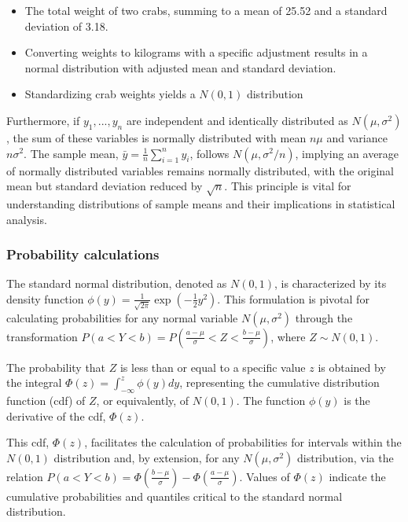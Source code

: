 \documentclass{article}
\begin{document}
\begin{itemize}
    \item The total weight of two crabs, summing to a mean of 25.52 and a standard deviation of 3.18.
    \item Converting weights to kilograms with a specific adjustment results in a normal distribution with adjusted mean and standard deviation.
    \item Standardizing crab weights yields a $N(0,1)$ distribution
\end{itemize}

Furthermore, if $y_1,...,y_n$ are independent and identically distributed as $N(\mu, \sigma^2)$, the sum of these variables is normally distributed with mean $n \mu$ and variance $n \sigma ^2$. The sample mean, $\bar{y} = \frac {1} {n} \sum_{i=1}^{n} y_i$, follows $N(\mu, \sigma ^2 / n)$, implying an average of normally distributed variables remains normally distributed, with the original mean but standard deviation reduced by $\sqrt{n}$. This principle is vital for understanding distributions of sample means and their implications in statistical analysis.

\subsubsection{Probability calculations}
The standard normal distribution, denoted as \(N(0, 1)\), is characterized by its density function \(\phi(y) = \frac{1}{\sqrt{2\pi}} \exp\left(-\frac{1}{2}y^2\right)\). This formulation is pivotal for calculating probabilities for any normal variable \(N(\mu, \sigma^2)\) through the transformation \(P(a < Y < b) = P\left(\frac{a - \mu}{\sigma} < Z < \frac{b - \mu}{\sigma}\right)\), where \(Z \sim N(0, 1)\).

The probability that \(Z\) is less than or equal to a specific value \(z\) is obtained by the integral \(\Phi(z) = \int_{-\infty}^{z} \phi(y) dy\), representing the cumulative distribution function (cdf) of \(Z\), or equivalently, of \(N(0, 1)\). The function \(\phi(y)\) is the derivative of the cdf, \(\Phi(z)\).

This cdf, \(\Phi(z)\), facilitates the calculation of probabilities for intervals within the \(N(0, 1)\) distribution and, by extension, for any \(N(\mu, \sigma^2)\) distribution, via the relation \(P(a < Y < b) = \Phi\left(\frac{b - \mu}{\sigma}\right) - \Phi\left(\frac{a - \mu}{\sigma}\right)\). Values of \(\Phi(z)\) indicate the cumulative probabilities and quantiles critical to the standard normal distribution.
\end{document}
